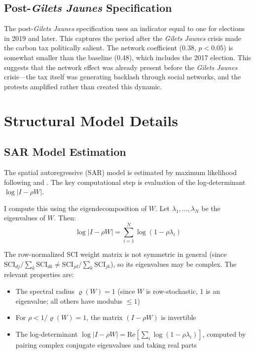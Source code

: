 \documentclass[12pt]{article}
\newcommand{\gj}{\textit{Gilets Jaunes}}
\begin{document}
\subsection{Post-\gj{} Specification}

The post-\gj{} specification uses an indicator equal to one for elections in 2019 and later. This captures the period after the \gj{} crisis made the carbon tax politically salient. The network coefficient (0.38, $p < 0.05$) is somewhat smaller than the baseline (0.48), which includes the 2017 election. This suggests that the network effect was already present before the \gj{} crisis---the tax itself was generating backlash through social networks, and the protests amplified rather than created this dynamic.



\section{Structural Model Details}
\label{app:structural}

\subsection{SAR Model Estimation}

The spatial autoregressive (SAR) model is estimated by maximum likelihood following \citet{lee2004asymptotic} and \citet{lesage2009introduction}. The key computational step is evaluation of the log-determinant $\log|I - \rho W|$.

I compute this using the eigendecomposition of $W$. Let $\lambda_1, \ldots, \lambda_N$ be the eigenvalues of $W$. Then:
\begin{equation}
\log|I - \rho W| = \sum_{i=1}^{N} \log(1 - \rho \lambda_i)
\end{equation}

The row-normalized SCI weight matrix is not symmetric in general (since $\text{SCI}_{dj}/\sum_k \text{SCI}_{dk} \neq \text{SCI}_{jd}/\sum_k \text{SCI}_{jk}$), so its eigenvalues may be complex. The relevant properties are:
\begin{itemize}
    \item The spectral radius $\varrho(W) = 1$ (since $W$ is row-stochastic, 1 is an eigenvalue; all others have modulus $\leq 1$)
    \item For $\rho < 1/\varrho(W) = 1$, the matrix $(I - \rho W)$ is invertible
    \item The log-determinant $\log|I - \rho W| = \text{Re}\left[\sum_i \log(1 - \rho\lambda_i)\right]$, computed by pairing complex conjugate eigenvalues and taking real parts
\end{itemize}
\end{document}
